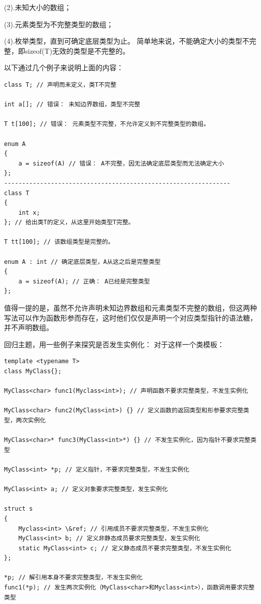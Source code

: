 \documentclass[UTF8]{ctexart}
\begin{document}
    (2).未知大小的数组；
    
    (3).元素类型为不完整类型的数组；
    
    (4).枚举类型，直到可确定底层类型为止。 简单地来说，不能确定大小的类型不完整，即sizeof(T)无效的类型是不完整的。

以下通过几个例子来说明上面的内容：
\begin{lstlisting}
class T; // 声明而未定义，类T不完整

int a[]; // 错误： 未知边界数组，类型不完整

T t[100]; // 错误： 元素类型不完整，不允许定义到不完整类型的数组。

enum A
{
    a = sizeof(A) // 错误： A不完整，因无法确定底层类型而无法确定大小
};
---------------------------------------------------------------
class T
{
    int x;
}; // 给出类T的定义，从这里开始类型T完整。

T tt[100]; // 该数组类型是完整的。

enum A : int // 确定底层类型，A从这之后是完整类型
{
    a = sizeof(A); // 正确： A已经是完整类型
};
\end{lstlisting}

值得一提的是，虽然不允许声明未知边界数组和元素类型不完整的数组，但这两种写法可以作为函数形参而存在，这时他们仅仅是声明一个对应类型指针的语法糖，并不声明数组。

回归主题，用一些例子来探究是否发生实例化： 对于这样一个类模板：
\begin{lstlisting}
template <typename T>
class MyClass{};

MyClass<char> func1(Myclass<int>); // 声明函数不要求完整类型，不发生实例化

MyClass<char> func2(MyClass<int>) {} // 定义函数的返回类型和形参要求完整类型，两次实例化

MyClass<char>* func3(MyClass<int>*) {} // 不发生实例化，因为指针不要求完整类型

MyClass<int> *p; // 定义指针，不要求完整类型，不发生实例化

MyClass<int> a; // 定义对象要求完整类型，发生实例化

struct s
{
    Myclass<int> \&ref; // 引用成员不要求完整类型，不发生实例化
    MyClass<int> b; // 定义非静态成员要求完整类型，发生实例化
    static MyClass<int> c; // 定义静态成员不要求完整类型，不发生实例化
};

*p; // 解引用本身不要求完整类型，不发生实例化
func1(*p); // 发生两次实例化（MyClass<char>和Myclass<int>），函数调用要求完整类型
\end{lstlisting}
\end{document}
